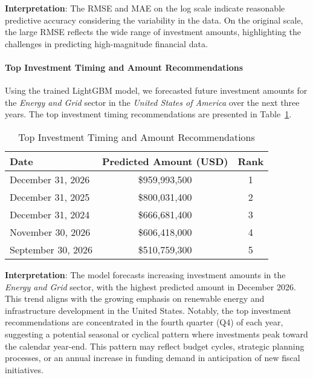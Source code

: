 \documentclass[sigconf]{acmart}
\begin{document}
\textbf{Interpretation}: The RMSE and MAE on the log scale indicate reasonable predictive accuracy considering the variability in the data. On the original scale, the large RMSE reflects the wide range of investment amounts, highlighting the challenges in predicting high-magnitude financial data.

\paragraph{Top Investment Timing and Amount Recommendations}

Using the trained LightGBM model, we forecasted future investment amounts for the \textit{Energy and Grid} sector in the \textit{United States of America} over the next three years. The top investment timing recommendations are presented in Table~\ref{tab:investment_recommendations}.

\begin{table}[htpb]
    \centering
    \caption{Top Investment Timing and Amount Recommendations}
    \label{tab:investment_recommendations}
    \begin{tabular}{lcc}
        \toprule
        \textbf{Date} & \textbf{Predicted Amount (USD)} & \textbf{Rank} \\
        \midrule
        December 31, 2026 & \$959,993,500 & 1 \\
        December 31, 2025 & \$800,031,400 & 2 \\
        December 31, 2024 & \$666,681,400 & 3 \\
        November 30, 2026 & \$606,418,000 & 4 \\
        September 30, 2026 & \$510,759,300 & 5 \\
        \bottomrule
    \end{tabular}
\end{table}

\textbf{Interpretation}: The model forecasts increasing investment amounts in the \textit{Energy and Grid} sector, with the highest predicted amount in December 2026. This trend aligns with the growing emphasis on renewable energy and infrastructure development in the United States. Notably, the top investment recommendations are concentrated in the fourth quarter (Q4) of each year, suggesting a potential seasonal or cyclical pattern where investments peak toward the calendar year-end. This pattern may reflect budget cycles, strategic planning processes, or an annual increase in funding demand in anticipation of new fiscal initiatives.
\end{document}
